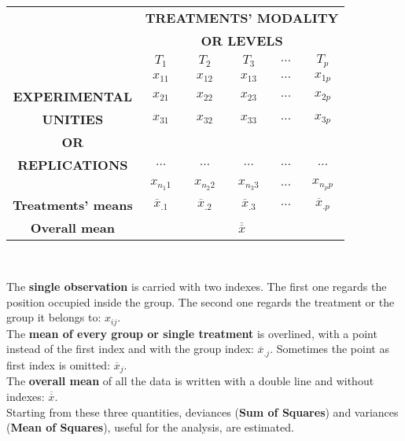 \begin{frame}
  \vspace*{.75cm}
  \begin{tabular}{|c|c|c|c|c|c|}
    \cline{2-6}
    \multicolumn{1}{c}{} & \multicolumn{5}{|c|}{\textbf{TREATMENTS' MODALITY}}\\ 
    \multicolumn{1}{c}{} & \multicolumn{5}{|c|}{\hspace*{.25cm}\textbf{OR LEVELS}\hspace*{.25cm}} \\ \cline{2-6}
    \multicolumn{1}{c|}{} & $T_1$ & $T_2$ & $T_3$ & $\dots$ & $T_p$\\ \hline
    \multicolumn{1}{|c|}{\hspace*{6cm}} & $x_{11}$ & $x_{12}$ & $x_{13}$ & $\dots$ & $x_{1p}$ \\ 
    \multicolumn{1}{|c|}{\textbf{EXPERIMENTAL}} & $x_{21}$ & $x_{22}$ & $x_{23}$ & $\dots$ & $x_{2p}$ \\
    \multicolumn{1}{|c|}{\textbf{UNITIES}} & $x_{31}$ & $x_{32}$ & $x_{33}$ & $\dots$ & $x_{3p}$ \\
    \multicolumn{1}{|c|}{\textbf{OR}} &  &  &  &  & \\
    \multicolumn{1}{|c|}{\textbf{REPLICATIONS}} & $\dots$ & $\dots$ & $\dots$ & $\dots$ & $\dots$\\
    \multicolumn{1}{|c|}{} & $x_{n_{1}1}$ & $x_{n_{2}2}$ & $x_{n_{3}3}$ & $\dots$ & $x_{n_{p}p}$ \\ \hline
    \multicolumn{1}{|c|}{\textbf{Treatments' means}} & $\overline{x}_{.1}$ & $\overline{x}_{.2}$ & $\overline{x}_{.3}$ & $\dots$ & $\overline{x}_{.p}$ \\ \hline
    \multicolumn{1}{|c|}{\textbf{Overall mean}} & \multicolumn{5}{|c|}{$\overline{\overline{x}}$}\\ \hline
  \end{tabular}\\
  \vspace*{.5cm}
\end{frame}

\begin{frame}
  \vspace*{.25cm}
  The \textbf{single observation} is carried with two indexes. The first one regards the position occupied inside the group. The second one regards the treatment or the group it belongs to: $ x_{ij} $. \\
  \vspace*{.5cm}
  The \textbf{mean of every group or single treatment} is overlined, with a point instead of the first index and with the group index: $ \overline{x}_{.j} $.
  Sometimes the point as first index is omitted:  $ \overline{x}_{j} $.\\
  \vspace*{.5cm}
  The \textbf{overall mean} of all the data is written with a double line and without indexes: $ \overline{\overline{x}} $.\\
  \vspace*{.5cm}
  Starting from these three quantities, deviances (\textbf{Sum of Squares}) and variances (\textbf{Mean of Squares}), useful for the analysis, are estimated.
\end{frame}

